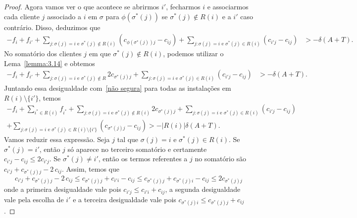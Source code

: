 \begin{proof}
    Agora vamos ver o que acontece se abrirmos $i'$, fecharmos $i$ e associarmos cada cliente $j$ associado a $i$ em $\sigma$ para $\phi(\sigma^*(j))$ se $\sigma^*(j) \not \in R(i)$ e a $i'$ caso contrário. Disso, deduzimos que
    \begin{align*}
        - f_i + f_{i'} + \sum_{j: \sigma(j) = i \text{ e } \sigma^*(j)\not \in R(i)}(c_{\phi(\sigma^*(j))j} - c_{ij}) + \sum_{j: \sigma(j)=i \text{ e }\sigma^*(j) \in R(i)}(c_{i'j} - c_{ij}) &> -\delta(A+T).
    \end{align*}
    No somatório dos clientes $j$ em que $\sigma^*(j) \not \in R(i)$, podemos utilizar o Lema~\ref{lemma:3.14} e obtemos
    \begin{align*}
        - f_i + f_{i'} + \sum_{j: \sigma(j) = i \text{ e } \sigma^*(j)\not \in R} 2c_{\sigma^*(j)j} + \sum_{j: \sigma(j)=i \text{ e }\sigma^*(j) \in R(i)}(c_{i'j} - c_{ij}) &> -\delta(A+T).
    \end{align*}
    Juntando essa desigualdade com~\eqref{não segura} para todas as instalações em $R(i)\setminus\{i'\}$, temos
    \begin{align*}
        -f_i + \sum_{i^* \in R(i)}f_{i^*} + \sum_{j: \sigma(j) = i \text{ e } \sigma^*(j)\not \in R(i)} 2c_{\sigma^*(j)j} + \sum_{j: \sigma(j)=i \text{ e }\sigma^*(j) \in R(i)}(c_{i'j} - c_{ij}) \\+ \sum_{j:\sigma(j)=i \text{ e }\sigma^*(j) \in R(i) \setminus\{i'\}}(c_{\sigma^*(j)j} - c_{ij}) > -|R(i)|\delta(A+T).
    \end{align*}
    Vamos reduzir essa expressão. Seja $j$ tal que $\sigma(j)=i$ e $\sigma^*(j) \in R(i)$. 
    Se $\sigma^*(j) = i'$, então $j$ só aparece no terceiro somatório e certamente $c_{i'j} - c_{ij} \leq 2 c_{i'j}$. 
    Se $\sigma^*(j)\neq i'$, então os termos referentes a $j$ no somatório são $c_{i'j} + c_{\sigma^*(j)j} - 2 \,c_{ij}$. Assim, temos que
    \[
            c_{i'j} + c_{\sigma^*(j)j} - 2 \,c_{ij} \leq 
            c_{\sigma^*(j)j} + c_{i'i} - c_{ij} \leq
            c_{\sigma^*(j)j} + c_{\sigma^*(j)i} - c_{ij} \leq
            2 c_{\sigma^*(j)j}
    \]
    onde a primeira desigualdade vale pois $c_{i'j} \leq c_{i'i} + c_{ij}$, a segunda desigualdade vale pela escolha de $i'$ e a terceira desigualdade vale pois $c_{\sigma^*(j)i} \leq c_{\sigma^*(j)j} + c_{ij}$.


\end{proof}
